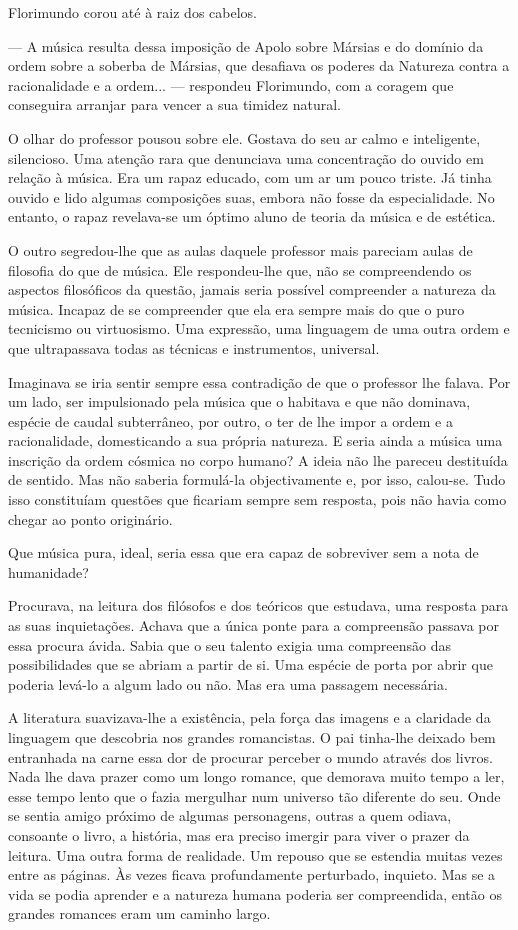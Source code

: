 Florimundo corou até à raiz dos cabelos.

--- A música resulta dessa imposição de Apolo sobre Mársias e do domínio
da ordem sobre a soberba de Mársias, que desafiava os poderes da
Natureza contra a racionalidade e a ordem... --- respondeu Florimundo, com
a coragem que conseguira arranjar para vencer a sua timidez natural.

O olhar do professor pousou sobre ele. Gostava do seu ar calmo e
inteligente, silencioso. Uma atenção rara que denunciava uma
concentração do ouvido em relação à música. Era um rapaz educado, com um
ar um pouco triste. Já tinha ouvido e lido algumas composições suas,
embora não fosse da especialidade. No entanto, o rapaz revelava-se um
óptimo aluno de teoria da música e de estética.

O outro segredou-lhe que as aulas daquele professor mais pareciam aulas
de filosofia do que de música. Ele respondeu-lhe que, não se
compreendendo os aspectos filosóficos da questão, jamais seria possível
compreender a natureza da música. Incapaz de se compreender que ela era
sempre mais do que o puro tecnicismo ou virtuosismo. Uma expressão, uma
linguagem de uma outra ordem e que ultrapassava todas as técnicas e
instrumentos, universal.

Imaginava se iria sentir sempre essa contradição de que o professor lhe
falava. Por um lado, ser impulsionado pela música que o habitava e que
não dominava, espécie de caudal subterrâneo, por outro, o ter de lhe
impor a ordem e a racionalidade, domesticando a sua própria natureza. E
seria ainda a música uma inscrição da ordem cósmica no corpo humano? A
ideia não lhe pareceu destituída de sentido. Mas não saberia formulá-la
objectivamente e, por isso, calou-se. Tudo isso constituíam questões que
ficariam sempre sem resposta, pois não havia como chegar ao ponto
originário.

Que música pura, ideal, seria essa que era capaz de sobreviver sem a
nota de humanidade?

Procurava, na leitura dos filósofos e dos teóricos que estudava, uma
resposta para as suas inquietações. Achava que a única ponte para a
compreensão passava por essa procura ávida. Sabia que o seu talento
exigia uma compreensão das possibilidades que se abriam a partir de si.
Uma espécie de porta por abrir que poderia levá-lo a algum lado ou não.
Mas era uma passagem necessária.

A literatura suavizava-lhe a existência, pela força das imagens e a
claridade da linguagem que descobria nos grandes romancistas. O pai
tinha-lhe deixado bem entranhada na carne essa dor de procurar perceber
o mundo através dos livros. Nada lhe dava prazer como um longo romance,
que demorava muito tempo a ler, esse tempo lento que o fazia mergulhar
num universo tão diferente do seu. Onde se sentia amigo próximo de
algumas personagens, outras a quem odiava, consoante o livro, a
história, mas era preciso imergir para viver o prazer da leitura. Uma
outra forma de realidade. Um repouso que se estendia muitas vezes entre
as páginas. Às vezes ficava profundamente perturbado, inquieto. Mas se a
vida se podia aprender e a natureza humana poderia ser compreendida,
então os grandes romances eram um caminho largo.

